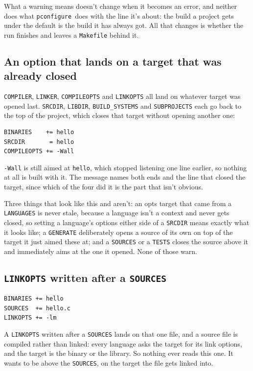 \documentclass{article}
\newcommand{\pconfigure}{\texttt{pconfigure}}
\begin{document}
What a warning means doesn't change when it becomes an error, and
neither does what \pconfigure\ does with the line it's about: the
build a project gets under the default is the build it has always
got.  All that changes is whether the run finishes and leaves a
\texttt{Makefile} behind it.

\subsection{An option that lands on a target that was already closed}

\texttt{COMPILER}, \texttt{LINKER}, \texttt{COMPILEOPTS} and
\texttt{LINKOPTS} all land on whatever target was opened last.
\texttt{SRCDIR}, \texttt{LIBDIR}, \texttt{BUILD\_SYSTEMS} and
\texttt{SUBPROJECTS} each go back to the top of the project, which
closes that target without opening another one:

\begin{verbatim}
BINARIES    += hello
SRCDIR       = hello
COMPILEOPTS += -Wall
\end{verbatim}

\texttt{-Wall} is still aimed at \texttt{hello}, which stopped
listening one line earlier, so nothing at all is built with it.  The
message names both ends and the line that closed the target, since
which of the four did it is the part that isn't obvious.

Three things that look like this and aren't: an opts target that came
from a \texttt{LANGUAGES} is never stale, because a language isn't a
context and never gets closed, so setting a language's options either
side of a \texttt{SRCDIR} means exactly what it looks like; a
\texttt{GENERATE} deliberately opens a source of its own on top of the
target it just aimed these at; and a \texttt{SOURCES} or a
\texttt{TESTS} closes the source above it and immediately aims at the
one it opened.  None of those warn.

\subsection{\texttt{LINKOPTS} written after a \texttt{SOURCES}}

\begin{verbatim}
BINARIES += hello
SOURCES  += hello.c
LINKOPTS += -lm
\end{verbatim}

A \texttt{LINKOPTS} written after a \texttt{SOURCES} lands on that one
file, and a source file is compiled rather than linked: every language
asks the target for its link options, and the target is the binary or
the library.  So nothing ever reads this one.  It wants to be above
the \texttt{SOURCES}, on the target the file gets linked into.
\end{document}
